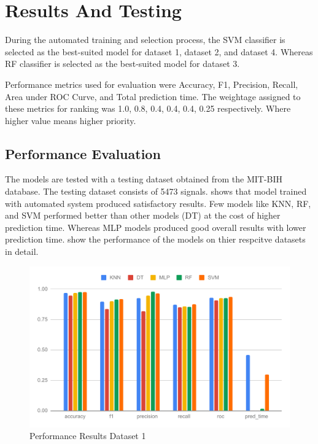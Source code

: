 \section{Results And Testing} \label{sec:results_and_testing}
During the automated training and selection process, the SVM classifier is selected as the best-suited model for dataset 1, dataset 2, and dataset 4. Whereas RF classifier is selected as the best-suited model for dataset 3. 

Performance metrics used for evaluation were Accuracy, F1, Precision, Recall, Area under ROC Curve, and Total prediction time. The weightage assigned to these metrics for ranking was 1.0, 0.8, 0.4, 0.4, 0.4, 0.25 respectively. Where higher value means higher priority.

\subsection{Performance Evaluation} \label{subsec:performance_evaluation}
The models are tested with a testing dataset obtained from the MIT-BIH database. The testing dataset consists of 5473 signals.  shows that model trained with automated system produced satisfactory results. Few models like KNN, RF, and SVM performed better than other models (DT) at the cost of higher prediction time. Whereas MLP models produced good overall results with lower prediction time.
 show the performance of the models on thier respcitve datasets in detail.

\begin{figure}[ht]
    \centering
    \includegraphics[width=1.9\columnwidth]{media/ch_result_and_testing/perf_ds_1.pdf}
    \caption{Performance Results Dataset 1} \label{fig:perfromance_results_dataset_1}
\end{figure}

